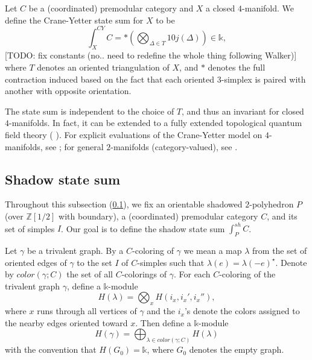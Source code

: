\begin{definition}\label{def/crane-yetter-state-sum-for-a-closed-4-manifold}
  Let $C$ be a (coordinated) premodular category and $X$ a closed
  $4$-manifold. We define the Crane-Yetter state sum for $X$ to
  be
  $$
  \int_{X}^{CY} C = \ast \left( \bigotimes_{\Delta \in T} 10j(\Delta) \right) \in \mathbb{k},
  $$
  [TODO: fix constants (no.. need to redefine the whole thing
  following Walker)] where $T$ denotes an oriented triangulation
  of $X$, and $\ast$ denotes the full contraction induced based
  on the fact that each oriented $3$-simplex is paired with
  another with opposite orientation.
\end{definition}

\noindent The state sum is independent to the choice of $T$, and
thus an invariant for closed $4$-manifolds. In fact, it can be
extended to a fully extended topological quantum field theory
(\cite[section 1.5]{bjs2018} \cite{cooke2019excision}
\cite{integrating-quantum-groups-over-surfaces}
\cite{fac-homo--kirillov-tham}). For explicit evaluations of the
Crane-Yetter model on $4$-manifolds, see
\cite{barenz/evaluation-crane-yetter}; for general $2$-manifolds
(category-valued), see \cite{guu/higher-genera-center}.

\subsection{Shadow state sum} \label{subsection/shadow-state-sum}

Throughout this subsection (\ref{subsection/shadow-state-sum}),
we fix an orientable shadowed $2$-polyhedron $P$ (over
$\mathbb{Z}[1/2]$ with boundary), a (coordinated) premodular
category $C$, and its set of simples $I$. Our goal is to define
the shadow state sum $\int_{P}^{sh} C$.

\begin{definition}\label{def/module-of-a-trivalent-graph}
Let $\gamma$ be a trivalent graph. By a $C$-coloring of $\gamma$
we mean a map $\lambda$ from the set of oriented edges of
$\gamma$ to the set $I$ of $C$-simples such that
$\lambda(e) = \lambda(-e)^{\star}$. Denote by $color(\gamma; C)$
the set of all $C$-colorings of $\gamma$. For each $C$-coloring
of the trivalent graph $\gamma$, define a $\mathbb{k}$-module
$$H(\lambda) = \bigotimes_{x} H(i_{x}, i_{x}', i_{x}''),$$
where $x$ runs through all vertices of $\gamma$ and the $i_{x}$'s
denote the colors assigned to the nearby edges oriented toward
$x$. Then define a $\mathbb{k}$-module
$$H(\gamma) = \bigoplus_{\lambda \in color(\gamma; C)} H(\lambda)$$
with the convention that $H(G_{0}) = \mathbb{k}$, where $G_{0}$
denotes the empty graph.
\end{definition}

